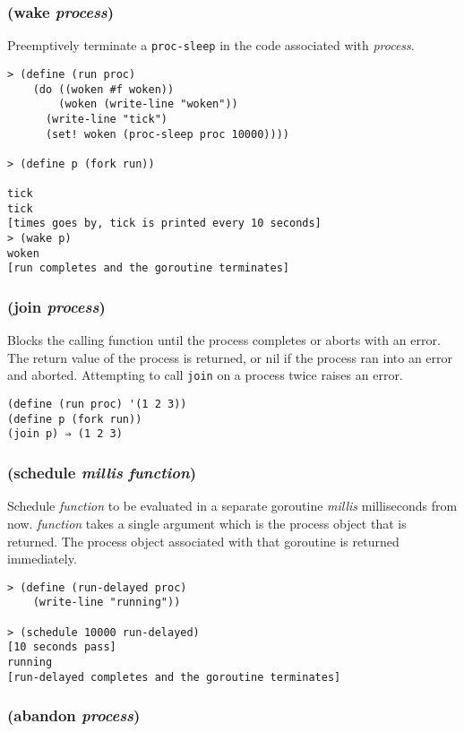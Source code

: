 \documentclass{article}
\begin{document}
\subsubsection{(wake \emph{process})}

Preemptively terminate a \verb|proc-sleep| in the code associated with \emph{process}.

\begin{verbatim}
> (define (run proc)
    (do ((woken #f woken))
        (woken (write-line "woken"))
      (write-line "tick")
      (set! woken (proc-sleep proc 10000))))

> (define p (fork run))

tick
tick
[times goes by, tick is printed every 10 seconds]
> (wake p)
woken
[run completes and the goroutine terminates]
\end{verbatim}

\subsubsection{(join \emph{process})}

Blocks the calling function until the process completes or aborts with an error. The return
value of the process is returned, or nil if the process ran into an error and aborted.
Attempting to call \verb|join| on a process twice raises an error.

\begin{verbatim}
(define (run proc) '(1 2 3))
(define p (fork run))
(join p) ⇒ (1 2 3)
\end{verbatim}

\subsubsection{(schedule \emph{millis} \emph{function})}

Schedule \emph{function} to be evaluated in a separate goroutine \emph{millis} milliseconds
from now. \emph{function} takes a single argument which is the process object that is
returned. The process object associated with that goroutine is returned immediately.

\begin{verbatim}
> (define (run-delayed proc)
    (write-line "running"))

> (schedule 10000 run-delayed)
[10 seconds pass]
running
[run-delayed completes and the goroutine terminates]
\end{verbatim}

\subsubsection{(abandon \emph{process})}
\end{document}
